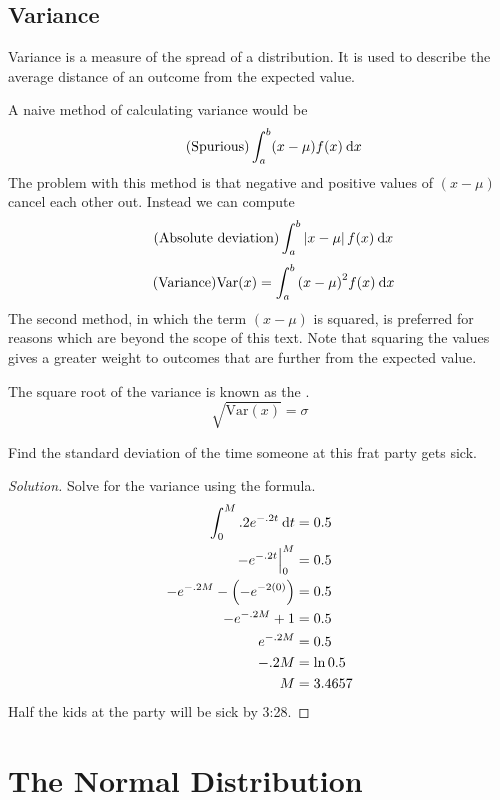 \documentclass[11pt,leqno,letterpaper]{article}
\begin{document}
\subsection{Variance}
Variance is a measure of the spread of a distribution.
It is used to describe the average distance of an outcome
from the expected value.

A naive method of calculating variance would be
\[
\tag{Spurious}
\int_a^b (x - \mu ) f(x) \:\mathrm{d}x
\]
The problem with this method is that negative and positive values of
$(x- \mu)$ cancel each other out. Instead we can compute
\[
\tag{Absolute deviation}
\int_a^b \left| x - \mu \right| f(x) \:\mathrm{d}x \\
\]
\[
\tag{Variance}
{\text{Var}(x)} = \int_a^b {(x - \mu )}^2 f(x) \:\mathrm{d}x
\]
The second method, in which the term $(x- \mu)$ is squared,
is preferred for reasons which are beyond the scope of this text.
Note that squaring the values gives a greater weight to outcomes
that are further from the expected value.

The square root of the variance is known as the
.
\[
\tag{Wow!}
\sqrt{\text{Var}(x)} = \sigma
\]
\begin{mdframed}
\begin{problem}
Find the standard deviation of the time
someone at this frat party gets sick.
\begin{proof}[Solution]
Solve for the variance using the formula.
\begin{align*}
\int_0^M .2e^{-.2t}\:\mathrm{d}t &= 0.5 \\
-e^{-.2t}\Big|_0^M &= 0.5 \\
-e^{-.2M}-\left(-e^{-2(0)}\right) &= 0.5 \\
-e^{-.2M} +1 &= 0.5 \\
e^{-.2M} &= 0.5 \\
-.2M &= \ln 0.5 \\
M &= 3.4657
\end{align*}
Half the kids at the party will be sick by 3:28\AM{}.
\end{proof}
\end{problem}
\end{mdframed}
\section{The Normal Distribution}
\end{document}
